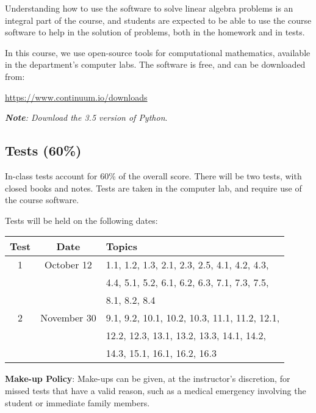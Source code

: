 \documentclass[11pt]{article}
\begin{document}
Understanding how to use the software to solve linear algebra problems is an integral part of the course, and students are expected to be able to use the course software to help in the solution of problems, both in the homework and in tests. 

In this course, we use open-source tools for computational mathematics, available in the department's computer labs. The software is free, and can be downloaded from:

\begin{center}
\url{https://www.continuum.io/downloads}
\end{center}

\emph{\textbf{Note}: Download the 3.5 version of Python}.

\subsection{Tests (60\%)} In-class tests account for 60\% of the overall score. There will be two tests, with closed books and notes. Tests are taken in the computer lab, and require use of the course software.

Tests will be held on the following dates:
\begin{center}
\begin{tabular}{|c|c|l|}\hline
\textbf{Test}   & \textbf{Date} & \textbf{Topics}\\\hline\hline
1 & October 12  & 1.1, 1.2, 1.3, 2.1, 2.3, 2.5, 4.1, 4.2, 4.3, \\
  &             & 4.4, 5.1, 5.2, 6.1, 6.2, 6.3, 7.1, 7.3, 7.5, \\
  &             & 8.1, 8.2, 8.4 \\\hline
2 & November 30 & 9.1, 9.2, 10.1, 10.2, 10.3, 11.1, 11.2, 12.1, \\
  &             & 12.2, 12.3, 13.1, 13.2, 13.3, 14.1, 14.2, \\
  &             & 14.3, 15.1, 16.1, 16.2, 16.3 \\ \hline
\end{tabular}
\end{center}

\textbf{Make-up Policy}: Make-ups can be given, at the instructor's discretion, for missed tests that have a valid reason, such as a medical emergency involving the student or immediate family members. 
\end{document}
